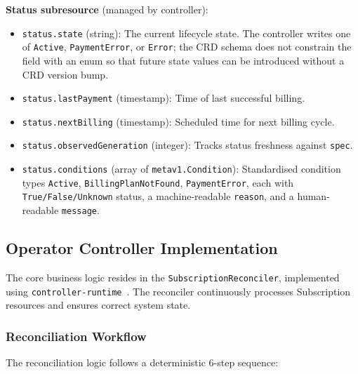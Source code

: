 \textbf{Status subresource} (managed by controller):
\begin{itemize}
    \item \texttt{status.state} (string): The current lifecycle state. The controller writes one of \texttt{Active}, \texttt{PaymentError}, or \texttt{Error}; the CRD schema does not constrain the field with an enum so that future state values can be introduced without a CRD version bump.
    \item \texttt{status.lastPayment} (timestamp): Time of last successful billing.
    \item \texttt{status.nextBilling} (timestamp): Scheduled time for next billing cycle.
    \item \texttt{status.observedGeneration} (integer): Tracks status freshness against \texttt{spec}.
    \item \texttt{status.conditions} (array of \texttt{metav1.Condition}): Standardised condition types \texttt{Active}, \texttt{BillingPlanNotFound}, \texttt{PaymentError}, each with \texttt{True/False/Unknown} status, a machine-readable \texttt{reason}, and a human-readable \texttt{message}.
\end{itemize}

\subsection{Operator Controller Implementation}

The core business logic resides in the \texttt{SubscriptionReconciler}, implemented using \texttt{controller-runtime}~\cite{controller_runtime, kubebuilder}. The reconciler continuously processes Subscription resources and ensures correct system state.

\subsubsection{Reconciliation Workflow}

The reconciliation logic follows a deterministic 6-step sequence:

